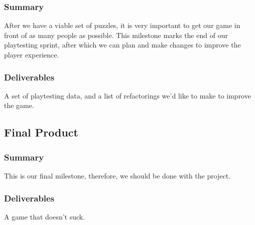 \subsubsection*{Summary}
After we have a viable set of puzzles, it is very important to get our game in
front of as many people as possible. This milestone marks the end of our
playtesting sprint, after which we can plan and make changes to improve the
player experience.
\subsubsection*{Deliverables}
A set of playtesting data, and a list of refactorings we’d like to make to
improve the game.

\subsection{Final Product}
\subsubsection*{Summary}
This is our final milestone, therefore, we should be done with the project.
\subsubsection*{Deliverables}
A game that doesn’t suck.
